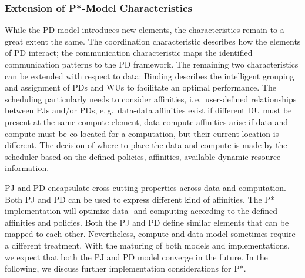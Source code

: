 \documentclass[conference,final]{IEEEtran}
\newcommand{\jhanote}[1]{ {\textcolor{red} { ***shantenu: #1 }}}
\newcommand{\alnote}[1]{ {\textcolor{blue} { ***andre: #1 }}}
\newcommand{\alnote}[1]{}
\newcommand{\jhanote}[1]{}
\begin{document}

\subsubsection*{Extension of P*-Model Characteristics}


While the PD model introduces new elements, the characteristics remain
to a great extent the same. The coordination characteristic describes
how the elements of PD interact; the communication characteristic maps
the identified communication patterns to the PD framework. The
remaining two characteristics can be extended with respect to data:
Binding describes the intelligent grouping and assignment of PDs and
WUs to facilitate an optimal performance. The scheduling particularly
needs to consider affinities, i.\,e.\ user-defined relationships
between PJs and/or PDs, e.\,g.\ data-data affinities exist if
different DU must be present at the same compute element, data-compute
affinities arise if data and compute must be co-located for a
computation, but their current location is different. The decision of
where to place the data and compute is made by the scheduler based on
the defined policies, affinities, available dynamic resource
information.


PJ and PD encapsulate cross-cutting properties across data and computation. Both
PJ and PD can be used to express different kind of affinities. The P*
implementation will optimize data- and computing according to the defined
affinities and policies. Both the PJ and PD define similar elements that can be
mapped to each other. Nevertheless, compute and data model sometimes require a
different treatment. With the maturing of both models and implementations, we
expect that both the PJ and PD model converge in the future. In the following,
we discuss further implementation considerations for P*.
\end{document}
